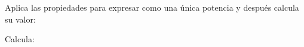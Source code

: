 \documentclass[spanish, 11pt]{exam}
\begin{document}
\begin{questions}
\begin{multicols}{3}
\end{multicols}

\question[2] Aplica las propiedades para expresar como una única potencia y después calcula su valor:
\begin{multicols}{2}
\end{multicols}

\question[1\half] Calcula:





\end{questions}
\end{document}
